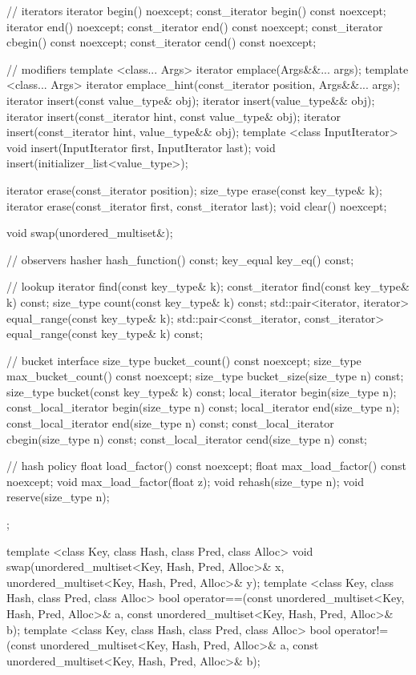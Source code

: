 \begin{codeblock}
{{    // iterators
    iterator       begin() noexcept;
    const_iterator begin() const noexcept;
    iterator       end() noexcept;
    const_iterator end() const noexcept;
    const_iterator cbegin() const noexcept;
    const_iterator cend() const noexcept;

    // modifiers
    template <class... Args> iterator emplace(Args&&... args);
    template <class... Args> iterator emplace_hint(const_iterator position, Args&&... args);
    iterator insert(const value_type& obj);
    iterator insert(value_type&& obj);
    iterator insert(const_iterator hint, const value_type& obj);
    iterator insert(const_iterator hint, value_type&& obj);
    template <class InputIterator> void insert(InputIterator first, InputIterator last);
    void insert(initializer_list<value_type>);

    iterator erase(const_iterator position);
    size_type erase(const key_type& k);
    iterator erase(const_iterator first, const_iterator last);
    void clear() noexcept;

    void swap(unordered_multiset&);

    // observers
    hasher hash_function() const;
    key_equal key_eq() const;

    // lookup
    iterator       find(const key_type& k);
    const_iterator find(const key_type& k) const;
    size_type count(const key_type& k) const;
    std::pair<iterator, iterator>             equal_range(const key_type& k);
    std::pair<const_iterator, const_iterator> equal_range(const key_type& k) const;

    // bucket interface
    size_type bucket_count() const noexcept;
    size_type max_bucket_count() const noexcept;
    size_type bucket_size(size_type n) const;
    size_type bucket(const key_type& k) const;
    local_iterator begin(size_type n);
    const_local_iterator begin(size_type n) const;
    local_iterator end(size_type n);
    const_local_iterator end(size_type n) const;
    const_local_iterator cbegin(size_type n) const;
    const_local_iterator cend(size_type n) const;

    // hash policy
    float load_factor() const noexcept;
    float max_load_factor() const noexcept;
    void max_load_factor(float z);
    void rehash(size_type n);
    void reserve(size_type n);
  };

  template <class Key, class Hash, class Pred, class Alloc>
    void swap(unordered_multiset<Key, Hash, Pred, Alloc>& x,
              unordered_multiset<Key, Hash, Pred, Alloc>& y);
    template <class Key, class Hash, class Pred, class Alloc>
      bool operator==(const unordered_multiset<Key, Hash, Pred, Alloc>& a,
                      const unordered_multiset<Key, Hash, Pred, Alloc>& b);
    template <class Key, class Hash, class Pred, class Alloc>
      bool operator!=(const unordered_multiset<Key, Hash, Pred, Alloc>& a,
                      const unordered_multiset<Key, Hash, Pred, Alloc>& b);
}
\end{codeblock}

